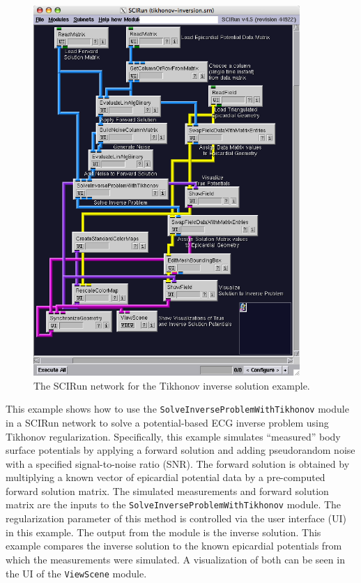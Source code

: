 \documentclass[fleqn,11pt,openany]{book}
\begin{document}
\begin{figure}[H]
\begin{center}
\includegraphics[width=0.9\textwidth]{ECGToolkitGuide_figures/TikhonovNetwork.png}
\caption{The SCIRun network for the Tikhonov inverse solution example.}
\label{TikhonovNetworkExample}
\end{center}
\end{figure}

This example shows how to use the {\tt SolveInverseProblemWithTikhonov} module in a SCIRun network to solve a potential-based ECG inverse problem using Tikhonov regularization. Specifically, this example simulates ``measured'' body surface potentials by applying a forward solution and adding pseudorandom noise with a specified signal-to-noise ratio (SNR). The forward solution is obtained by multiplying a known vector of epicardial potential data by a pre-computed forward solution matrix. The simulated measurements and forward solution matrix are the inputs to the {\tt SolveInverseProblemWithTikhonov} module. The regularization parameter of this method is controlled via the user interface (UI) in this example. The output from the module is the inverse solution. This example compares the inverse solution to the known epicardial potentials from which the measurements were simulated. A visualization of both can be seen in the UI of the {\tt ViewScene} module.
\end{document}
